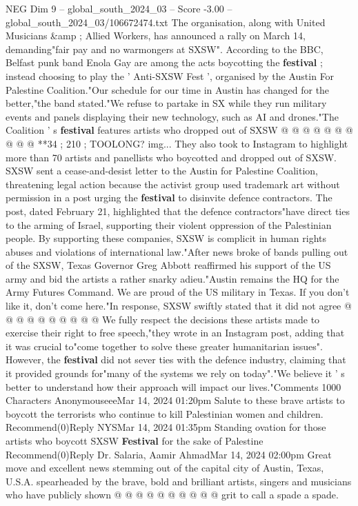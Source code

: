 \begin{textsample}{NEG Dim 9 – global\_south\_2024\_03 – Score -3.00 – global\_south\_2024\_03/106672474.txt}
The organisation, along with United Musicians \&amp ; Allied Workers, has announced a rally on March 14, demanding"fair pay and no warmongers at SXSW".
According to the BBC, Belfast punk band Enola Gay are among the acts boycotting the \textbf{festival} ; instead choosing to play the ' Anti-SXSW Fest ', organised by the Austin For Palestine Coalition."Our schedule for our time in Austin has changed for the better,"the band stated."We refuse to partake in SX while they run military events and panels displaying their new technology, such as AI and drones."The Coalition ' s \textbf{festival} features artists who dropped out of SXSW @ @ @ @ @ @ @ @ @ @ **34 ; 210 ; TOOLONG? img...
They also took to Instagram to highlight more than 70 artists and panellists who boycotted and dropped out of SXSW.
SXSW sent a cease-and-desist letter to the Austin for Palestine Coalition, threatening legal action because the activist group used trademark art without permission in a post urging the \textbf{festival} to disinvite defence contractors.
The post, dated February 21, highlighted that the defence contractors"have direct ties to the arming of Israel, supporting their violent oppression of the Palestinian people.
By supporting these companies, SXSW is complicit in human rights abuses and violations of international law."After news broke of bands pulling out of the SXSW, Texas Governor Greg Abbott reaffirmed his support of the US army and bid the artists a rather snarky adieu."Austin remains the HQ for the Army Futures Command.
We are proud of the US military in Texas.
If you don't like it, don't come here."In response, SXSW swiftly stated that it did not agree @ @ @ @ @ @ @ @ @ @ We fully respect the decisions these artists made to exercise their right to free speech,"they wrote in an Instagram post, adding that it was crucial to"come together to solve these greater humanitarian issues".
However, the \textbf{festival} did not sever ties with the defence industry, claiming that it provided grounds for"many of the systems we rely on today"."We believe it ' s better to understand how their approach will impact our lives."Comments 1000 Characters AnonymouseeeMar 14, 2024 01:20pm Salute to these brave artists to boycott the terrorists who continue to kill Palestinian women and children.
Recommend(0)Reply NYSMar 14, 2024 01:35pm Standing ovation for those artists who boycott SXSW \textbf{Festival} for the sake of Palestine Recommend(0)Reply Dr.
Salaria, Aamir AhmadMar 14, 2024 02:00pm Great move and excellent news stemming out of the capital city of Austin, Texas, U.S.A. spearheaded by the brave, bold and brilliant artists, singers and musicians who have publicly shown @ @ @ @ @ @ @ @ @ @ grit to call a spade a spade.

\end{textsample}
